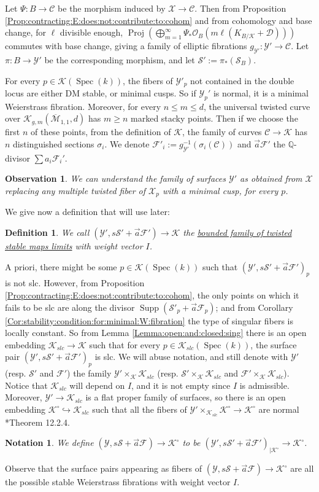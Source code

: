 \documentclass[11pt]{amsart}
\newcommand{\sD}{\mathscr{D}}
\newcommand{\sC}{\mathscr{C}}
\newcommand{\sF}{\mathscr{F}}
\newcommand{\sS}{\mathscr{S}}
\newcommand{\sX}{\mathscr{X}}
\newcommand{\cO}{\mathcal{O}}
\newcommand{\spec}{\operatorname{Spec}}
\newcommand{\Kg}{\mathcal{K}}
\newcommand{\sY}{\mathscr{Y}}
\newcommand{\supp}{\operatorname{Supp}}
\newtheorem{Def}[theorem]{Definition}
\newtheorem{Oss}[theorem]{Observation}
\newtheorem{Notation}[theorem]{Notation}
\theoremstyle{definition}
\begin{document}
 Let $\Psi:B \to \sC$ be the morphism
induced by $\sX \to \sC$. Then
from Proposition \ref{Prop:contracting:E:does:not:contribute:to:cohom} and from cohomology and base change, for $\ell$ divisible enough,
$\operatorname{Proj}(\bigoplus _{m=1}^\infty \Psi_*\cO_{B}( m\ell(K_{B/\Kg}+ \sD) ))$
commutes with base change, giving a family of elliptic fibrations $g_{\sY'}^{\text{ }}:\sY' \to \sC$. Let $\pi:B \to \sY'$ be the corresponding morphism,
and let $\sS':=\pi_*(\sS_B)$.

For every $p \in \Kg(\spec(k))$, the fibers of $\sY'_p$ not contained in the double locus are either DM stable, or minimal cusps.
So if $\sY_p'$ is normal, it is a minimal Weierstrass fibration.
Moreover, for every $n \le m \le d$, the universal twisted curve
over $\Kg_{g,m}(\overline{\mathcal{M}}_{1,1},d)$ has $m \ge n$ marked stacky points. Then if we choose the first $n$ of these points, 
from the definition of $\Kg$, the family of curves $\sC \to \Kg$ has $n$ distinguished sections $\sigma_i$. We denote $\sF'_i:=g_{\sY'}^{-1}(\sigma_i(\sC))$ and $\vec{a}\sF'$ the $\mathbb{Q}$-divisor $\sum a_i \sF_i'$.
\begin{Oss}\label{Oss:description:that:the:blow:ups:replace:twisted:with:mcusps}
We can understand the family of surfaces $\sY'$ as obtained from $\sX$ replacing any multiple twisted fiber of $\sX_p$ with a minimal cusp, for every $p$.
\end{Oss}
We give now a definition that will use later:
\begin{Def}\label{Def:bounded:family:tsm:limits}We call $(\sY',s\sS'+\vec{a}\sF') \to \Kg$ the \underline{bounded family of twisted stable maps limits} with weight vector $I$. 
\end{Def}


A priori, there might be some $p \in \Kg(\spec(k))$ such that $(\sY',s\sS'+\vec{a}\sF')_p$ is not slc. However, from Proposition \ref{Prop:contracting:E:does:not:contribute:to:cohom}, the only points on which it fails to be slc are along the divisor $\supp(\sS'_p + \vec{a} \sF_p)$; and from Corollary
\ref{Cor:stability:condition:for:minimal:W:fibration} the type of singular fibers is locally constant. So from Lemma
\ref{Lemma:open:and:closed:sing} there is an open embedding $\Kg_{slc} \to \Kg$ such that
for every $p \in \Kg_{slc}(\spec(k))$, the surface pair $(\sY',s\sS'+\vec{a}\sF')_p$ is
slc. We will abuse notation, and still denote with $\sY'$ (resp. $\sS'$ and $\sF'$) the family $\sY' \times_\Kg \Kg_{slc}$ (resp. $\sS' \times_\Kg \Kg_{slc}$ and $\sF' \times_\Kg \Kg_{slc}$).
Notice that $\Kg_{slc}$ will depend on $I$, and it is not empty since
$I$ is admissible. Moreover, $\sY' \to \Kg_{slc}$ is a flat proper family of surfaces, so there is an open embedding $\Kg^\circ \hookrightarrow \Kg_{slc}$ such that all the fibers of
$\sY'\times_{\Kg_{slc}}\Kg^\circ
\to \Kg^\circ$ are normal \cite{EGAIV}*{Theorem 12.2.4}.
\begin{Notation}\label{Def:sY}
 We define $(\sY,s\sS+\vec{a}\sF) \to \Kg^\circ$ to be $(\sY',s\sS'+\vec{a}\sF')_{|\Kg^\circ} \to \Kg^\circ$. 
\end{Notation}
Observe that the surface pairs appearing as fibers of $(\sY,s\sS+\vec{a}\sF) \to \Kg^\circ$ are all the possible stable Weierstrass fibrations with weight vector $I$.
\end{document}
